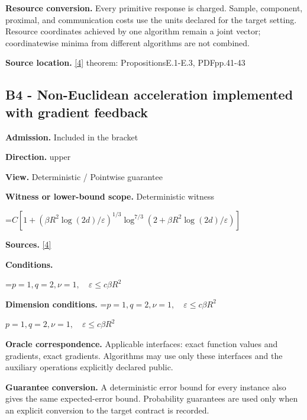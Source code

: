 \documentclass[10pt,a4paper]{article}
\newcommand{\AtlasMath}[1]{\par\begingroup\centering\setbox0=\hbox{$\displaystyle #1$}\ifdim\wd0>1.4\linewidth\typeout{ATLAS WIDE FORMULA: \the\wd0}\fi\ifdim\wd0>\linewidth\resizebox{\linewidth}{!}{\box0}\else\box0\fi\par\endgroup}
\newcommand{\AtlasInlineMath}[1]{\begingroup\setbox0=\hbox{$#1$}\ifdim\wd0>.4\linewidth\endgroup\AtlasMath{#1}\else\endgroup$#1$\fi}
\begin{document}
\textbf{Resource conversion.} Every primitive response is charged. Sample, component, proximal, and communication costs use the units declared for the target setting. Resource coordinates achieved by one algorithm remain a joint vector; coordinatewise minima from different algorithms are not combined.



\textbf{Source location.} \href{https://arxiv.org/pdf/2609.32910}{[4]} theorem: PropositionsE.1-E.3, PDFpp.41-43



\subsection{B4 - Non-Euclidean acceleration implemented with gradient feedback}


\textbf{Admission.} Included in the bracket



\textbf{Direction.} upper



\textbf{View.} Deterministic / Pointwise guarantee



\textbf{Witness or lower-bound scope.} Deterministic witness



\AtlasMath{C[1+(\beta R^2\log(2d)/\varepsilon)^{1/3}\log^{7/3}(2+\beta R^2\log(2d)/\varepsilon)]}


\textbf{Sources.} \href{https://arxiv.org/pdf/2609.32910}{[4]}



\textbf{Conditions.}
\AtlasMath{p=1,q=2,\nu=1,\quad\varepsilon\le c\beta R^2}




\textbf{Dimension conditions.} \AtlasInlineMath{p=1,q=2,\nu=1,\quad\varepsilon\le c\beta R^2}



\textbf{Oracle correspondence.} Applicable interfaces: exact function values and gradients, exact gradients. Algorithms may use only these interfaces and the auxiliary operations explicitly declared public.



\textbf{Guarantee conversion.} A deterministic error bound for every instance also gives the same expected-error bound. Probability guarantees are used only when an explicit conversion to the target contract is recorded.
\end{document}
